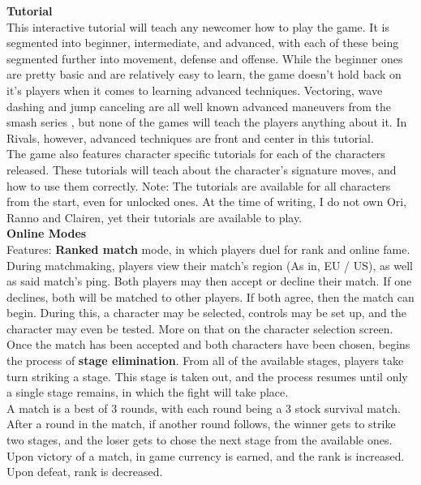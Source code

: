 \documentclass{article}
\begin{document}
\textbf{Tutorial}\\
This interactive tutorial will teach any newcomer how to play the game. It is segmented into beginner, intermediate, and advanced, with each of these being segmented further into movement, defense and offense. While the beginner ones are pretty basic and are relatively easy to learn, the game doesn't hold back on it's players when it comes to learning advanced techniques. Vectoring, wave dashing and jump canceling are all well known advanced maneuvers from the smash series \cite{atomic2017:2} \cite{manual:3}, %
but none of the games will teach the players anything about it. In Rivals, however, advanced techniques are front and center in this tutorial.\\
The game also features character specific tutorials for each of the characters released. These tutorials will teach about the character's signature moves, and how to use them correctly. Note: The tutorials are available for all characters from the start, even for unlocked ones. At the time of writing, I do not own Ori, Ranno and Clairen, yet their tutorials are available to play.\\

\textbf{Online Modes}\\
Features: \textbf{Ranked match} mode, in which players duel for rank and online fame. During matchmaking, players view their match's region (As in, EU / US), as well as said match's ping. Both players may then accept or decline their match. If one declines, both will be matched to other players. If both agree, then the match can begin. During this, a character may be selected, controls may be set up, and the character may even be tested. More on that on the character selection screen.\\
Once the match has been accepted and both characters have been chosen, begins the process of \textbf{stage elimination}. From all of the available stages, players take turn striking a stage. This stage is taken out, and the process resumes until only a single stage remains, in which the fight will take place.\\
A match is a best of 3 rounds, with each round being a 3 stock survival match. After a round in the match, if another round follows, the winner gets to strike two stages, and the loser gets to chose the next stage from the available ones.\\
Upon victory of a match, in game currency is earned, and the rank is increased. Upon defeat, rank is decreased.\\
\end{document}
